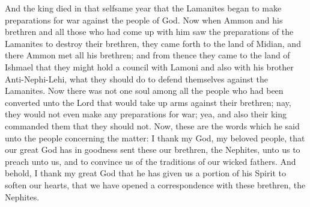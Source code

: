 \bverse \iffalse And the king died in that selfsame year that the Lamanites began to make preparations for war against the people of God. \fi
And the king died in that selfsame year that the Lamanites began to make preparations for war against the people of God.
\bverse \iffalse Now when Ammon and his brethren and all those who had come up with him saw the preparations of the Lamanites to destroy their brethren, they came forth to the land of Midian, and there Ammon met all his brethren; and from thence they came to the land of Ishmael that they might hold a council with Lamoni and also with his brother Anti-Nephi-Lehi, what they should do to defend themselves against the Lamanites. \fi
Now when Ammon and his brethren and all those who had come up with him saw the preparations of the Lamanites to destroy their brethren, they came forth to the land of Midian, and there Ammon met all his brethren; and from thence they came to the land of Ishmael that they might hold a council with Lamoni and also with his brother Anti-Nephi-Lehi, what they should do to defend themselves against the Lamanites.
\bverse \iffalse Now there was not one soul among all the people who had been converted unto the Lord that would take up arms against their brethren; nay, they would not even make any preparations for war; yea, and also their king commanded them that they should not. \fi
Now there was not one soul among all the people who had been converted unto the Lord that would take up arms against their brethren; nay, they would not even make any preparations for war; yea, and also their king commanded them that they should not.
\bverse \iffalse Now, these are the words which he said unto the people concerning the matter: I thank my God, my beloved people, that our great God has in goodness sent these our brethren, the Nephites, unto us to preach unto us, and to convince us of the traditions of our wicked fathers. \fi
Now, these are the words which he said unto the people concerning the matter: I thank my God, my beloved people, that our great God has in goodness sent these our brethren, the Nephites, unto us to preach unto us, and to convince us of the traditions of our wicked fathers.
\bverse \iffalse And behold, I thank my great God that he has given us a portion of his Spirit to soften our hearts, that we have opened a correspondence with these brethren, the Nephites. \fi
And behold, I thank my great God that he has given us a portion of his Spirit to soften our hearts, that we have opened a correspondence with these brethren, the Nephites.
